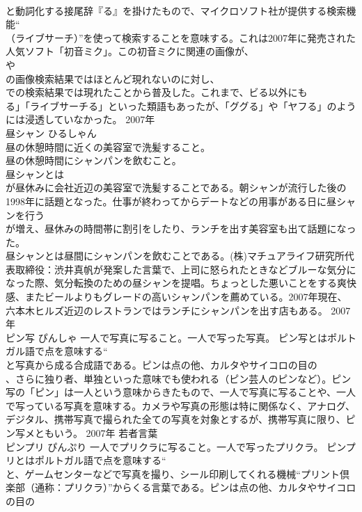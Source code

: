 \documentclass[8pt]{extreport}
\begin{document}
\begin{CJK}{UTF8}{min}
\\	と動詞化する接尾辞『る』を掛けたもので、マイクロソフト社が提供する検索機能“
\\	（ライブサーチ）”を使って検索することを意味する。これは2007年に発売された人気ソフト「初音ミク」。この初音ミクに関連の画像が、
\\	や
\\	の画像検索結果ではほとんど現れないのに対し、
\\	での検索結果では現れたことから普及した。これまで、ビる以外にも
\\	る」「ライブサーチる」といった類語もあったが、「ググる」や「ヤフる」のようには浸透していなかった。	2007年	
\\	昼シャン	ひるしゃん	
\\	昼の休憩時間に近くの美容室で洗髪すること。 
\\	昼の休憩時間にシャンパンを飲むこと。	
\\	昼シャンとは
\\	が昼休みに会社近辺の美容室で洗髪することである。朝シャンが流行した後の1998年に話題となった。仕事が終わってからデートなどの用事がある日に昼シャンを行う
\\	が増え、昼休みの時間帯に割引をしたり、ランチを出す美容室も出て話題になった。 
\\	昼シャンとは昼間にシャンパンを飲むことである。(株)マチュアライフ研究所代表取締役：渋井真帆が発案した言葉で、上司に怒られたときなどブルーな気分になった際、気分転換のための昼シャンを提唱。ちょっとした悪いことをする爽快感、またビールよりもグレードの高いシャンパンを薦めている。2007年現在、六本木ヒルズ近辺のレストランではランチにシャンパンを出す店もある。	2007年	
\\	ピン写	ぴんしゃ	一人で写真に写ること。一人で写った写真。	ピン写とはポルトガル語で点を意味する“
\\	と写真から成る合成語である。ピンは点の他、カルタやサイコロの目の
\\	、さらに独り者、単独といった意味でも使われる（ピン芸人のピンなど）。ピン写の「ピン」は一人という意味からきたもので、一人で写真に写ることや、一人で写っている写真を意味する。カメラや写真の形態は特に関係なく、アナログ、デジタル、携帯写真で撮られた全ての写真を対象とするが、携帯写真に限り、ピン写メともいう。	2007年	若者言葉	
\\	ピンプリ	ぴんぷり	一人でプリクラに写ること。一人で写ったプリクラ。	ピンプリとはポルトガル語で点を意味する“
\\	と、ゲームセンターなどで写真を撮り、シール印刷してくれる機械“プリント倶楽部（通称：プリクラ）”からくる言葉である。ピンは点の他、カルタやサイコロの目の

\end{CJK}
\end{document}
